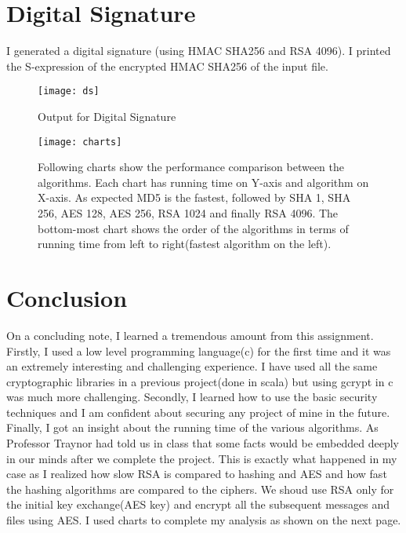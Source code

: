\documentclass[11pt, pdftex]{article}
\begin{document}
\section{Digital Signature}
I generated a digital signature (using HMAC SHA256 and RSA 4096). I printed the S-expression of the encrypted HMAC SHA256 of the input file.
\begin{figure}[t]
	\caption{Output for Digital Signature}
	\centering
	\texttt{[image: ds]}
\end{figure}

\newpage
\begin{figure}[t]
	\caption{Following charts show the performance comparison between the algorithms. Each chart has running time on Y-axis and algorithm on X-axis. As expected MD5 is the fastest, followed by SHA 1, SHA 256, AES 128, AES 256, RSA 1024 and finally RSA 4096. The bottom-most chart shows the order of the algorithms in terms of running time from left to right(fastest algorithm on the left). }
	\centering
	\texttt{[image: charts]}
\end{figure}
\newpage

\section{Conclusion}
On a concluding note, I learned a tremendous amount from this assignment. Firstly, I used a low level programming language(c) for the first time and it was an extremely interesting and challenging experience. I have used all the same cryptographic libraries in a previous project(done in scala) but using gcrypt in c was much more challenging. Secondly, I learned how to use the basic security techniques and I am confident about securing any project of mine in the future. Finally, I got an insight about the running time of the various algorithms. As Professor Traynor had told us in class that some facts would be embedded deeply in our minds after we complete the project. This is exactly what happened in my case as I realized how slow RSA is compared to hashing and AES and how fast the hashing algorithms are compared to the ciphers. We shoud use RSA only for the initial key exchange(AES key) and encrypt all the subsequent messages and files using AES. I used charts to complete my analysis as shown on the next page.
\end{document}
